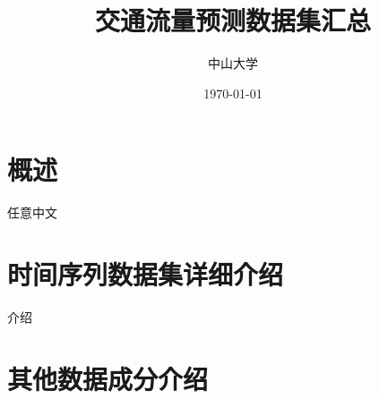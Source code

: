 \documentclass{ctexart}
\begin{document}
\title{交通流量预测数据集汇总}
\author{中山大学}
\date{\today}
\maketitle
\tableofcontents
\section{概述}
任意中文\cite{zhu_big_2019}

\section{时间序列数据集详细介绍}
介绍

\section{其他数据成分介绍}



\end{document}

